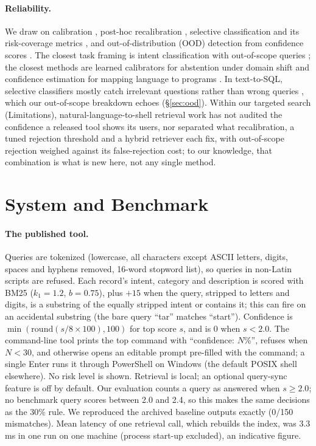 \paragraph{Reliability.} We draw on calibration \citep{guo2017calibration,naeini2015ece}, post-hoc
recalibration \citep{zadrozny2002isotonic,platt2000probabilistic,zadrozny2001binning}, selective classification
and its risk-coverage metrics \citep{geifman2017selective,geifman2019aurc,traub2024overcoming}, and out-of-distribution (OOD) detection
from confidence scores \citep{hendrycks2017baseline}. The closest task framing is intent classification with
out-of-scope queries \citep{larson-etal-2019-evaluation}; the closest methods are learned calibrators for
abstention under domain shift \citep{kamath-etal-2020-selective} and confidence estimation for mapping language to
programs \citep{dong-etal-2018-confidence}. In text-to-SQL, selective classifiers mostly catch irrelevant questions
rather than wrong queries \citep{somov2025texttosql}, which our out-of-scope breakdown echoes (\S\ref{sec:ood}).
Within our targeted search (Limitations), natural-language-to-shell retrieval work has not audited the confidence
a released tool shows its users, nor separated what recalibration, a tuned rejection threshold and a hybrid
retriever each fix, with out-of-scope rejection weighed against its false-rejection cost; to our knowledge, that
combination is what is new here, not any single method.

\section{System and Benchmark}
\label{sec:system}

\paragraph{The published tool.} Queries are tokenized (lowercase, all characters except ASCII letters, digits,
spaces and hyphens removed, 16-word stopword list), so queries in non-Latin scripts are refused. Each record's intent,
category and description is scored with BM25 ($k_1=1.2$, $b=0.75$), plus $+15$ when the query, stripped to
letters and digits, is a substring of the equally stripped intent or contains it; this can fire on an accidental
substring (the bare query ``tar'' matches ``start''). Confidence is $\min(\mathrm{round}(s/8\times100),100)$ for
top score $s$, and is 0 when $s<2.0$. The command-line tool prints the top command with ``confidence: $N$\%'',
refuses when $N<30$, and otherwise opens an editable prompt pre-filled with the command; a single Enter runs it
through PowerShell on Windows (the default POSIX shell elsewhere). No risk level is shown. Retrieval is local; an
optional query-sync feature is off by default. Our evaluation counts a query as answered when $s\geq2.0$; no
benchmark query scores between 2.0 and 2.4, so this makes the same decisions as the 30\% rule. We reproduced the
archived baseline outputs exactly (0/150 mismatches). Mean latency of one retrieval call, which rebuilds the index,
was 3.3\,ms in one run on one machine (process start-up excluded), an indicative figure.

